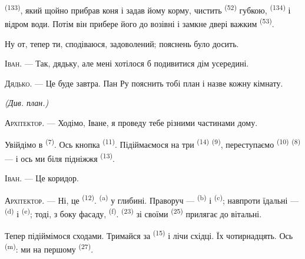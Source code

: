  \textsuperscript{(133)}, який щойно прибрав коня і задав йому
корму, чистить  \textsuperscript{(52)} губкою,  \textsuperscript{(134)} і відром води. Потім він прибере його до
возівні і замкне двері важким  \textsuperscript{(53)}.

Ну от, тепер ти, сподіваюся, задоволений; пояснень було досить.

\textsc{Іван}. --- Так, дядьку, але мені хотілося б подивитися дім усередині.

\textsc{Дядько}. --- Це буде завтра. Пан Ру пояснить тобі план і назве кожну
кімнату.

\VUsaut{3.0mm}
\VUsaut{2.4mm}

{\centering\textit{(Див. план.)}\par}
\VUsaut{2.4mm}

\textsc{Архітектор}. --- Ходімо, Іване, я проведу тебе різними частинами дому.

Увійдімо в  \textsuperscript{(7)}. Ось кнопка
 \textsuperscript{(11)}. Підіймаємося на три 
\textsuperscript{(14)}  \textsuperscript{(9)}, переступаємо
 \textsuperscript{(10)} 
\textsuperscript{(8)} --- і ось ми біля підніжжя 
\textsuperscript{(13)}.

\textsc{Іван}. --- Це коридор.

\textsc{Архітектор}. --- Ні, це  \textsuperscript{(12)}.
 \textsuperscript{(a)} у глибині. Праворуч ---
 \textsuperscript{(b)} і 
\textsuperscript{(c)}; навпроти їдальні --- 
\textsuperscript{(d)} і  \textsuperscript{(e)}; тоді, з боку
фасаду,  \textsuperscript{(f)}. 
\textsuperscript{(23)} зі своїми 
\textsuperscript{(25)} прилягає до вітальні.

Тепер підіймімося сходами. Тримайся за  \textsuperscript{(15)} і
лічи східці. Їх чотирнадцять. Ось  \textsuperscript{(m)}: ми на
першому  \textsuperscript{(27)}.

\VUsaut{3.0mm}
\VUsaut{3.0mm}

